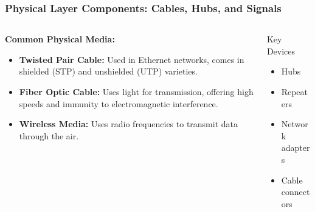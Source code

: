 \documentclass{beamer}
\begin{document}
\begin{frame}
    \frametitle{Physical Layer Components: Cables, Hubs, and Signals}
    
    \begin{columns}[t]
        \begin{column}{0.6\textwidth}
            \textbf{Common Physical Media:}
            \begin{itemize}
                \item \textbf{Twisted Pair Cable:} Used in Ethernet networks, comes in shielded (STP) and unshielded (UTP) varieties.
                
                \item \textbf{Fiber Optic Cable:} Uses light for transmission, offering high speeds and immunity to electromagnetic interference.
                
                \item \textbf{Wireless Media:} Uses radio frequencies to transmit data through the air.
            \end{itemize}
        \end{column}
        
        \begin{column}{0.4\textwidth}
            \begin{alertblock}{Key Devices}
                \begin{itemize}
                    \item Hubs
                    \item Repeaters
                    \item Network adapters
                    \item Cable connectors
                \end{itemize}
            \end{alertblock}
        \end{column}
    \end{columns}
\end{frame}
\end{document}
